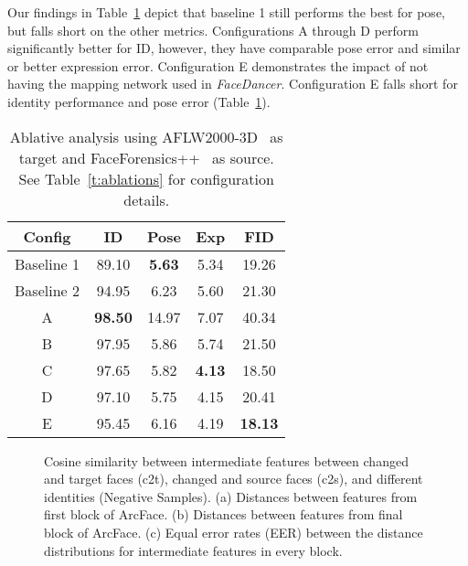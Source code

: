 \documentclass[10pt,twocolumn,letterpaper]{article}
\newcommand{\fti}[1]{\textit{FaceDancer}{#1}}
\begin{document}
Our findings in Table~\ref{t:compare2} depict that baseline 1 still performs the best for pose, but falls short on the other metrics.
Configurations A through D perform significantly better for ID, however, they have comparable pose error and similar or better expression error. Configuration E  demonstrates  the impact of not having the mapping network  used in \fti. Configuration E falls short for identity performance and pose error (Table~\ref{t:compare2}).

\begin{table}[!t]
\caption{Ablative analysis using AFLW2000-3D~\cite{aflw2000} as target and FaceForensics++~\cite{faceforensics++} as source. See Table~\ref{t:ablations} for configuration details.}
\label{t:compare2}
\begin{center}
\begin{tabular}{c|cccc}
\hline
Config & ID & Pose & Exp & FID\\
\hline
{\scriptsize Baseline 1} & 89.10 & \textbf{5.63} & 5.34 & 19.26\\
{\scriptsize Baseline 2} & 94.95 & 6.23 & 5.60 & 21.30\\
A & \textbf{98.50} & 14.97 & 7.07 & 40.34\\
B & 97.95 & 5.86 & 5.74 & 21.50\\
C & 97.65 & 5.82 & \textbf{4.13} & 18.50\\
D & 97.10 & 5.75 & 4.15 & 20.41\\
E & 95.45 & 6.16 & 4.19 & \textbf{18.13}\\


\hline
\end{tabular}
\end{center}
\end{table}


\begin{figure*}[!t]
\centering
{}
\caption{Cosine similarity between intermediate features between changed and target faces (c2t), changed and source faces (c2s), and different identities (Negative Samples).
(a) Distances between features from first block of ArcFace. 
(b) Distances between features from final block of ArcFace.
(c) Equal error rates (EER) between the distance distributions for intermediate features in every block.}
\label{fig:blocks}
\end{figure*}
\end{document}
